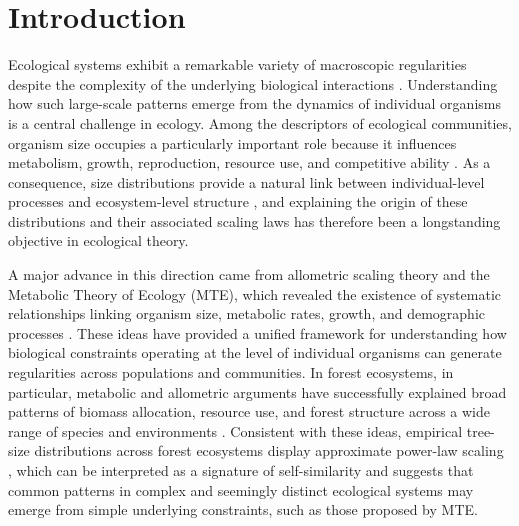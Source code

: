 \documentclass[aps,pre,twocolumn,superscriptaddress,10pt]{revtex4-2}
\begin{document}
\maketitle

\section*{Introduction}
Ecological systems exhibit a remarkable variety of macroscopic regularities despite the complexity of the underlying biological interactions \cite{Levin1992}. Understanding how such large-scale patterns emerge from the dynamics of individual organisms is a central challenge in ecology. Among the descriptors of ecological communities, organism size occupies a particularly important role because it influences metabolism, growth, reproduction, resource use, and competitive ability  \cite{Kleiber1961energetics,damuth2001scaling,Marquet_2005}. As a consequence, size distributions provide a natural link between individual-level processes and ecosystem-level structure  \cite{Damuth1981,banavar1999size,enquist2001invariant,Marquet_2002}, and explaining the origin of these distributions and their associated scaling laws has therefore been a longstanding objective in ecological theory.

A major advance in this direction came from allometric scaling theory and the Metabolic Theory of Ecology (MTE), which revealed the existence of systematic relationships linking organism size, metabolic rates, growth, and demographic processes \cite{west1997general,enquist1998allometric,west2001general,enquist2002global,brown2004toward,Marquet2004}. These ideas have provided a unified framework for understanding how biological constraints operating at the level of individual organisms can generate regularities across populations and communities.
In forest ecosystems, in particular, metabolic and allometric arguments have successfully explained broad patterns of biomass allocation, resource use, and forest structure across a wide range of species and environments \cite{purves2008predicting,strigul2008scaling,mori2010mixed,banavar2014form,simini2010self,volkov2022seeing}. Consistent with these ideas, empirical tree-size distributions across forest ecosystems display approximate power-law scaling \cite{enquist1998allometric,Enquist1999,simini2010self}, which can be interpreted as a signature of self-similarity and suggests that common patterns in complex and seemingly distinct ecological systems may emerge from simple underlying constraints, such as those proposed by MTE.
\end{document}
